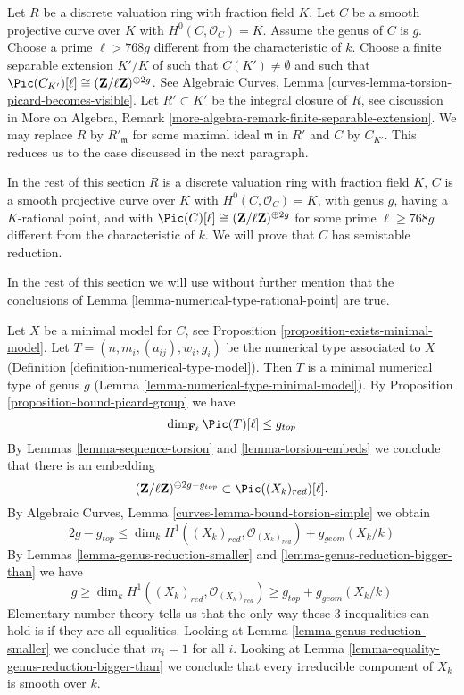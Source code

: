 \medskip\noindent
Let $R$ be a discrete valuation ring with fraction field $K$.
Let $C$ be a smooth projective curve over $K$ with $H^0(C, \mathcal{O}_C) = K$.
Assume the genus of $C$ is $g$.
Choose a prime $\ell > 768g$ different from the characteristic of $k$.
Choose a finite separable extension $K'/K$ of
such that $C(K') \not = \emptyset$ and such that
$\Pic(C_{K'})[\ell] \cong (\mathbf{Z}/\ell \mathbf{Z})^{\oplus 2g}$.
See
Algebraic Curves, Lemma \ref{curves-lemma-torsion-picard-becomes-visible}.
Let $R' \subset K'$ be the integral closure of $R$, see
discussion in More on Algebra, Remark
\ref{more-algebra-remark-finite-separable-extension}.
We may replace $R$ by $R'_{\mathfrak m}$ for some maximal ideal
$\mathfrak m$ in $R'$ and $C$ by $C_{K'}$. This
reduces us to the case discussed in the next paragraph.

\medskip\noindent
In the rest of this section
$R$ is a discrete valuation ring with fraction field $K$,
$C$ is a smooth projective curve over $K$ with $H^0(C, \mathcal{O}_C) = K$,
with genus $g$, having a $K$-rational point, and with
$\Pic(C)[\ell] \cong (\mathbf{Z}/\ell \mathbf{Z})^{\oplus 2g}$
for some prime $\ell \geq 768g$ different from the characteristic of $k$.
We will prove that $C$ has semistable reduction.

\medskip\noindent
In the rest of this section we will use without further mention
that the conclusions of Lemma \ref{lemma-numerical-type-rational-point}
are true.

\medskip\noindent
Let $X$ be a minimal model for $C$, see
Proposition \ref{proposition-exists-minimal-model}.
Let $T = (n, m_i, (a_{ij}), w_i, g_i)$
be the numerical type associated to $X$
(Definition \ref{definition-numerical-type-model}).
Then $T$ is a minimal numerical type of genus $g$
(Lemma \ref{lemma-numerical-type-minimal-model}).
By Proposition \ref{proposition-bound-picard-group}
we have
$$
\dim_{\mathbf{F}_\ell} \Pic(T)[\ell] \leq g_{top}
$$
By Lemmas \ref{lemma-sequence-torsion} and \ref{lemma-torsion-embeds}
we conclude that there is an embedding
$$
(\mathbf{Z}/\ell \mathbf{Z})^{\oplus 2g - g_{top}}
\subset \Pic((X_k)_{red})[\ell].
$$
By Algebraic Curves, Lemma \ref{curves-lemma-bound-torsion-simple} we obtain
$$
2g - g_{top} \leq
\dim_k H^1((X_k)_{red}, \mathcal{O}_{(X_k)_{red}}) + g_{geom}(X_k/k)
$$
By Lemmas \ref{lemma-genus-reduction-smaller} and
\ref{lemma-genus-reduction-bigger-than}
we have
$$
g \geq \dim_k H^1((X_k)_{red}, \mathcal{O}_{(X_k)_{red}}) \geq
g_{top} + g_{geom}(X_k/k)
$$
Elementary number theory tells us that the only way these $3$
inequalities can hold is if they are all equalities.
Looking at Lemma \ref{lemma-genus-reduction-smaller}
we conclude that $m_i = 1$ for all $i$.
Looking at Lemma \ref{lemma-equality-genus-reduction-bigger-than}
we conclude that every irreducible component of $X_k$
is smooth over $k$.

